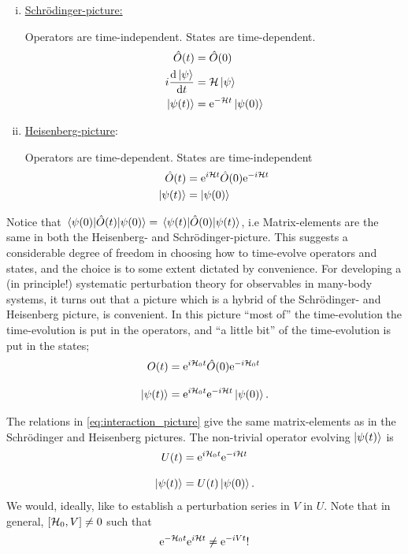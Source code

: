\begin{enumerate}[i)]
	\item \underline{Schrödinger-picture:} 
	
	Operators are time-independent. States are time-dependent.
	\begin{align*} 
	\hat{O}(t) &= \hat{O}(0) \\
	i\dv{\ket{\psi}}{t} &= \mathcal{H}\ket{\psi} \\
	\ket{\psi(t)} &= \mathrm{e}^{-\mathcal{H} t}\ket{\psi(0)}
	\end{align*}
	
	\item \underline{Heisenberg-picture}:
	
	Operators are time-dependent. States are time-independent
	\begin{align} 
	\hat{O}(t) &= \mathrm{e}^{i\mathcal{H} t}\hat{O}(0)\mathrm{e}^{-i\mathcal{H} t} \\
	\ket{\psi(t)} &= \ket{\psi(0)}
	\end{align}		
\end{enumerate}
Notice that $\mel{\psi(0)}{\hat{O}(t)}{\psi(0)} = \mel{\psi(t)}{\hat{O}(0)}{\psi(t)}$, i.e Matrix-elements are the same in both the Heisenberg- and Schrödinger-picture.
This suggests a considerable degree of freedom in choosing how to time-evolve operators and states, and the choice is to some extent dictated by convenience. 
For developing a (in principle!) systematic perturbation theory for observables in many-body systems, it turns out that a picture which is a hybrid of the Schrödinger- and Heisenberg picture, is convenient. In this picture ``most of'' the time-evolution the time-evolution is put in the operators, and  ``a little bit'' of the time-evolution is put in the states; 
\begin{align}
\label{eq:interaction_picture}
\begin{split} 
O(t) &= \mathrm{e}^{i\mathcal{H}_0 t}\hat{O}(0)\mathrm{e}^{-i\mathcal{H}_0 t} \\[2ex]
\ket{\psi(t)} &= \mathrm{e}^{i\mathcal{H}_0 t}\mathrm{e}^{-i\mathcal{H} t}\ket{\psi(0)}.
\end{split}
\end{align}

The relations in \cref{eq:interaction_picture} give the same matrix-elements as in the Schrödinger and Heisenberg pictures. 
The non-trivial operator evolving $\ket{\psi(t)}$ is
\begin{align} 
U(t) &= \mathrm{e}^{i\mathcal{H}_0 t}\mathrm{e}^{-i\mathcal{H} t} \\[2ex]
\ket{\psi(t)} &= U(t)\ket{\psi(0)}.
\end{align}
 We would, ideally, like to establish a perturbation series in $V$ in $U$. 
 Note that in general, $\comm{\Ha_0}{V}\ne 0$ such that \[\mathrm{e}^{-\mathcal{H}_0 t}\mathrm{e}^{i\mathcal{H} t}\ne \mathrm{e}^{-iV t}!\]
 
